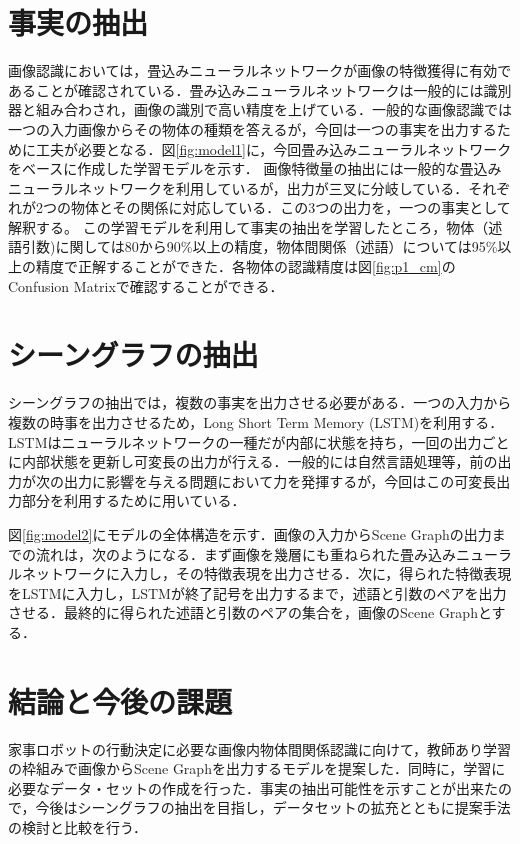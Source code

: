 
\section{事実の抽出}
画像認識においては，畳込みニューラルネットワークが画像の特徴獲得に有効であることが確認されている．畳み込みニューラルネットワークは一般的には識別器と組み合わされ，画像の識別で高い精度を上げている．一般的な画像認識では一つの入力画像からその物体の種類を答えるが，今回は一つの事実を出力するために工夫が必要となる．図\ref{fig:model1}に，今回畳み込みニューラルネットワークをベースに作成した学習モデルを示す．
画像特徴量の抽出には一般的な畳込みニューラルネットワークを利用しているが，出力が三叉に分岐している．それぞれが2つの物体とその関係に対応している．この3つの出力を，一つの事実として解釈する。
この学習モデルを利用して事実の抽出を学習したところ，物体（述語引数)に関しては80から90\%以上の精度，物体間関係（述語）については95\%以上の精度で正解することができた．各物体の認識精度は図\ref{fig:p1_cm}のConfusion Matrixで確認することができる．
\section{シーングラフの抽出}
シーングラフの抽出では，複数の事実を出力させる必要がある．一つの入力から複数の時事を出力させるため，Long Short Term Memory (LSTM)\cite{lstm}を利用する．LSTMはニューラルネットワークの一種だが内部に状態を持ち，一回の出力ごとに内部状態を更新し可変長の出力が行える．一般的には自然言語処理等，前の出力が次の出力に影響を与える問題において力を発揮するが，今回はこの可変長出力部分を利用するために用いている．

図\ref{fig:model2}にモデルの全体構造を示す．画像の入力からScene Graphの出力までの流れは，次のようになる．まず画像を幾層にも重ねられた畳み込みニューラルネットワークに入力し，その特徴表現を出力させる．次に，得られた特徴表現をLSTMに入力し，LSTMが終了記号を出力するまで，述語と引数のペアを出力させる．最終的に得られた述語と引数のペアの集合を，画像のScene Graphとする．

\section{結論と今後の課題}
家事ロボットの行動決定に必要な画像内物体間関係認識に向けて，教師あり学習の枠組みで画像からScene Graphを出力するモデルを提案した．同時に，学習に必要なデータ・セットの作成を行った．事実の抽出可能性を示すことが出来たので，今後はシーングラフの抽出を目指し，データセットの拡充とともに提案手法の検討と比較を行う．




